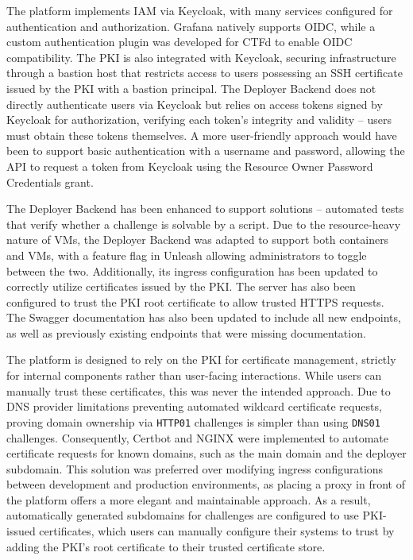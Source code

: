 The platform implements IAM via Keycloak, with many services configured for authentication and authorization. Grafana natively supports OIDC, while a custom authentication plugin was developed for CTFd to enable OIDC compatibility. The PKI is also integrated with Keycloak, securing infrastructure through a bastion host that restricts access to users possessing an SSH certificate issued by the PKI with a bastion principal. The Deployer Backend does not directly authenticate users via Keycloak but relies on access tokens signed by Keycloak for authorization, verifying each token's integrity and validity -- users must obtain these tokens themselves. A more user-friendly approach would have been to support basic authentication with a username and password, allowing the API to request a token from Keycloak using the Resource Owner Password Credentials grant.

The Deployer Backend has been enhanced to support solutions -- automated tests that verify whether a challenge is solvable by a script. Due to the resource-heavy nature of VMs, the Deployer Backend was adapted to support both containers and VMs, with a feature flag in Unleash allowing administrators to toggle between the two. Additionally, its ingress configuration has been updated to correctly utilize certificates issued by the PKI. The server has also been configured to trust the PKI root certificate to allow trusted HTTPS requests. The Swagger documentation has also been updated to include all new endpoints, as well as previously existing endpoints that were missing documentation.

The platform is designed to rely on the PKI for certificate management, strictly for internal components rather than user-facing interactions. While users can manually trust these certificates, this was never the intended approach. Due to DNS provider limitations preventing automated wildcard certificate requests, proving domain ownership via \texttt{HTTP01} challenges is simpler than using \texttt{DNS01} challenges. Consequently, Certbot and NGINX were implemented to automate certificate requests for known domains, such as the main domain and the deployer subdomain. This solution was preferred over modifying ingress configurations between development and production environments, as placing a proxy in front of the platform offers a more elegant and maintainable approach. As a result, automatically generated subdomains for challenges are configured to use PKI-issued certificates, which users can manually configure their systems to trust by adding the PKI's root certificate to their trusted certificate store.

